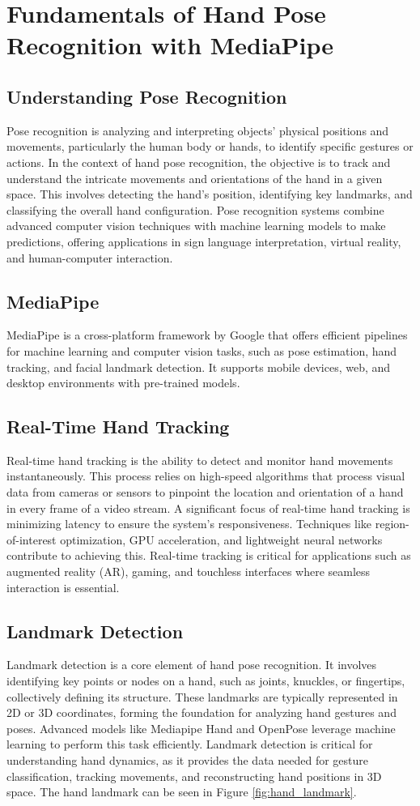 \chapter{Fundamentals of Hand Pose Recognition with MediaPipe}

\section{Understanding Pose Recognition}
Pose recognition is analyzing and interpreting objects' physical positions and movements, particularly the human body or hands, to identify specific gestures or actions. In the context of hand pose recognition, the objective is to track and understand the intricate movements and orientations of the hand in a given space. This involves detecting the hand's position, identifying key landmarks, and classifying the overall hand configuration. Pose recognition systems combine advanced computer vision techniques with machine learning models to make predictions, offering applications in sign language interpretation, virtual reality, and human-computer interaction.
\section{MediaPipe}
MediaPipe is a cross-platform framework by Google that offers efficient pipelines for machine learning and computer vision tasks, such as pose estimation, hand tracking, and facial landmark detection. It supports mobile devices, web, and desktop environments with pre-trained models.
\section{Real-Time Hand Tracking}
Real-time hand tracking is the ability to detect and monitor hand movements instantaneously. This process relies on high-speed algorithms that process visual data from cameras or sensors to pinpoint the location and orientation of a hand in every frame of a video stream. A significant focus of real-time hand tracking is minimizing latency to ensure the system's responsiveness. Techniques like region-of-interest optimization, GPU acceleration, and lightweight neural networks contribute to achieving this. Real-time tracking is critical for applications such as augmented reality (AR), gaming, and touchless interfaces where seamless interaction is essential.
\section{Landmark Detection}
Landmark detection is a core element of hand pose recognition. It involves identifying key points or nodes on a hand, such as joints, knuckles, or fingertips, collectively defining its structure. These landmarks are typically represented in 2D or 3D coordinates, forming the foundation for analyzing hand gestures and poses. Advanced models like Mediapipe Hand and OpenPose leverage machine learning to perform this task efficiently. Landmark detection is critical for understanding hand dynamics, as it provides the data needed for gesture classification, tracking movements, and reconstructing hand positions in 3D space. The hand landmark can be seen in Figure \ref{fig:hand_landmark}.

